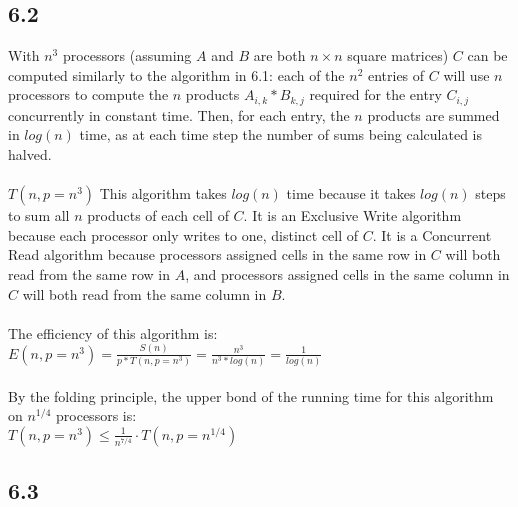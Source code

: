 \documentclass[letterpaper,notitlepage,twoside]{article}
\begin{document}
\subsection*{6.2}
With $n^3$ processors (assuming $A$ and $B$ are both $n \times n$ square matrices) $C$ can be computed similarly to the algorithm in 6.1: each of the $n^2$ entries of $C$ will use $n$ processors to compute the $n$ products $A_{i, k} * B_{k, j}$ required for the entry $C_{i, j}$ concurrently in constant time. Then, for each entry,  the $n$ products are summed in $log(n)$ time, as at each time step the number of sums being calculated is halved.  \\\\
$T(n, p = n^3)$ This algorithm takes $log(n)$ time because it takes $log(n)$ steps to sum all $n$ products of each cell of $C$. It is an Exclusive Write algorithm because each processor only writes to one, distinct cell of $C$. It is a Concurrent Read algorithm because processors assigned cells in the same row in $C$ will both read from the same row in $A$, and processors assigned cells in the same column in $C$ will both read from the same column in $B$. \\\\
The efficiency of this algorithm is: $E(n, p=n^3) = \frac{S(n)}{p * T(n, p = n^3)} = \frac{n^3}{n^3 * log(n)} = \frac{1}{log(n)}$\\\\
By the folding principle, the upper bond of the running time for this algorithm on $n^{1/4}$ processors is:\\
$T(n, p = n^3) \leq \frac{1}{n^{7/4}} \cdot T(n, p = n^{1/4})$

\subsection*{6.3}
\end{document}
